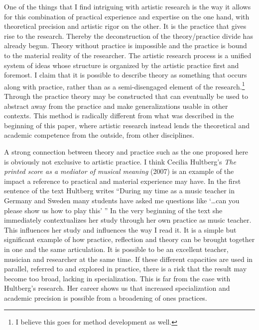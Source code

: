 \documentclass[12pt]{article}
\begin{document}
One of the things that I find intriguing with artistic research is the way it allows for this combination of practical experience and expertise on the one hand, with theoretical precision and artistic rigor on the other. It is the practice that gives rise to the research. Thereby the deconstruction of the theory/practice divide has already begun. Theory without practice is impossible and the practice is bound to the material reality of the researcher. The artistic research process is a unified system of ideas whose structure is organized by the artistic practice first and foremost. I claim that it is possible to describe theory as something that occurs along with practice, rather than as a semi-disengaged element of the research.\footnote{I believe this goes for method development as well.} Through the practice theory may be constructed that can eventually be used to abstract away from the practice and make generalizations usable in other contexts. This method is radically different from what was described in the beginning of this paper, where artistic research instead lends the theoretical and academic competence from the outside, from other disciplines.

A strong connection between theory and practice such as the one proposed here is obviously not exclusive to artistic practice. I think Cecilia Hultberg's \emph{The printed score as a mediator of musical meaning} (2007) is an example of the impact a reference to practical and material experience may have. In the first sentence of the text Hultberg writes ``During my time as a music teacher in Germany and Sweden many students have asked me questions like `\ldots can you please show us how to play this' '' In the very beginning of the text she immediately contextualizes her study through her own practice as music teacher. This influences her study and influences the way I read it. It is a simple but significant example of how practice, reflection and theory can be brought together in one and the same articulation. It is possible to be an excellent teacher, musician and researcher at the same time. If these different capacities are used in parallel, referred to and explored in practice, there is a risk that the result may become too broad, lacking in specialization. This is far from the case with Hultberg's research. Her career shows us that increased specialization and academic precision is possible from a broadening of ones practices.
\end{document}
